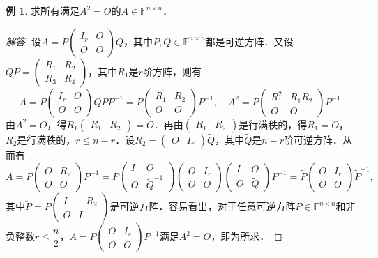 \documentclass[a4paper,fontset=windows]{ctexbook}
\theoremstyle{definition}
\newtheorem{example}{例}[chapter]
\renewcommand{\le}{\leqslant}
\begin{document}
\begin{example}
求所有满足$A^2=O$的$A\in\mathbb{F}^{n\times n}$．
\end{example}

\begin{proof}[解答]
设$A=P\begin{pmatrix}I_r&O \\ O&O\end{pmatrix}Q$，其中$P,Q\in\mathbb{F}^{n\times n}$都是可逆方阵．又设$QP=\begin{pmatrix}R_1&R_2 \\ R_3&R_4\end{pmatrix}$，其中$R_1$是$r$阶方阵，则有
$$A=P\begin{pmatrix}I_r&O \\ O&O\end{pmatrix}QPP^{-1}=P\begin{pmatrix}R_1&R_2 \\ O&O\end{pmatrix}P^{-1},\quad A^2=P\begin{pmatrix}R_1^2&R_1R_2 \\ O&O\end{pmatrix}P^{-1}.$$
由$A^2=O$，得$R_1\begin{pmatrix}R_1&R_2\end{pmatrix}=O$．再由$\begin{pmatrix}R_1&R_2\end{pmatrix}$是行满秩的，得$R_1=O$，$R_2$是行满秩的，$r\le n-r$．设$R_2=\begin{pmatrix}O&I_r\end{pmatrix}\widetilde{Q}$，其中$\widetilde{Q}$是$n-r$阶可逆方阵．从而有
$$A=P\begin{pmatrix}O&R_2 \\ O&O\end{pmatrix}P^{-1}=P\begin{pmatrix}I&O \\ O&\widetilde{Q}^{-1}\end{pmatrix}\begin{pmatrix}O&I_r \\ O&O\end{pmatrix}\begin{pmatrix}I&O \\ O&\widetilde{Q}\end{pmatrix}P^{-1}=\widetilde{P}\begin{pmatrix}O&I_r \\ O&O\end{pmatrix}\widetilde{P}^{-1},$$
其中$\widetilde{P}=P\begin{pmatrix}I&-R_2 \\ O&I\end{pmatrix}$是可逆方阵．容易看出，对于任意可逆方阵$P\in\mathbb{F}^{n\times n}$和非负整数$r\le\dfrac{n}{2}$，$A=P\begin{pmatrix}O&I_r \\ O&O\end{pmatrix}P^{-1}$满足$A^2=O$，即为所求．
\end{proof}
\end{document}
